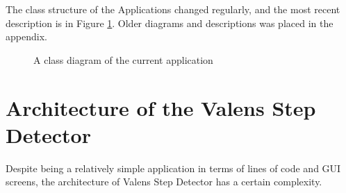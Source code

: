 The class structure of the Applications changed regularly, and the most recent description is in Figure \ref{fig:ClassDiagram}. Older diagrams and descriptions was placed in the appendix. 
\begin{figure}[p]
\label{fig:ClassDiagram}

\setlength\fboxsep{0pt}
\setlength\fboxrule{1pt}
\caption{A class diagram of the current application}
\end{figure}

\section{Architecture of the Valens Step Detector}

Despite being a relatively simple application in terms of lines of code and GUI screens, the architecture of Valens Step Detector has a certain complexity.

